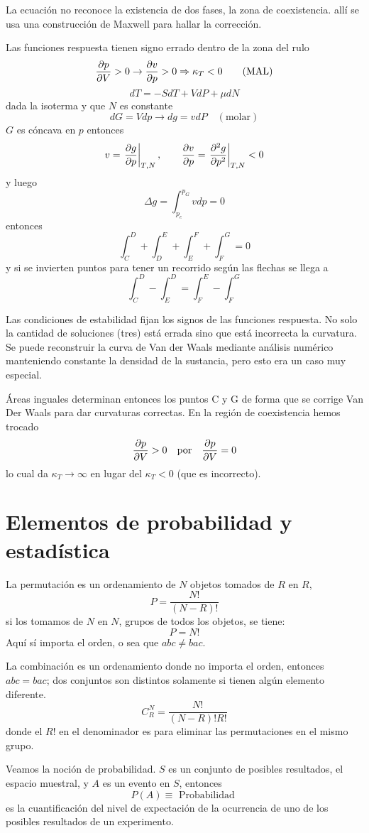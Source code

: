 \documentclass[10pt,oneside]{CBFT_book}
\begin{document}
La ecuación no reconoce la existencia de dos fases, la zona de coexistencia.
allí se usa una construcción de Maxwell para hallar la corrección.


Las funciones respuesta tienen signo errado dentro de la zona del rulo
\[
	\dpar{p}{V}>0 \rightarrow  \dpar{v}{p} >0 \Rightarrow \kappa_T < 0 \qquad (\mathrm{MAL})
\]
\[
	dT = -SdT + VdP + \mu dN
\]
dada la isoterma y que $N$ es constante 
\[
	dG = Vdp \rightarrow dg = v dP \quad (\mathrm{molar})
\]
$G$ es cóncava en $p$ entonces 
\[
	v = \left.\dpar{g}{p} \right|_{T,N}, \qquad  
	\dpar{v}{p} =\left.\dpar[2]{g}{p} \right|_{T,N} < 0
\]
y luego 
\[
	\Delta g = \int_{p_c}^{p_G} v dp = 0
\]
entonces 
\[
	\int_C^D + \int_D^E + \int_E^F + \int_F^G = 0
\]
y si se invierten puntos para tener un recorrido según las flechas se llega a 
\[
	\int_C^D - \int_E^D = \int_F^E - \int_F^G 
\]

Las condiciones de estabilidad fijan los signos de las funciones respuesta.
No solo la cantidad de soluciones (tres) está errada sino que está incorrecta
la curvatura.
Se puede reconstruir la curva de Van der Waals mediante análisis numérico manteniendo
constante la densidad de la sustancia, pero esto era un caso muy especial.


Áreas inguales determinan entonces los puntos C y G de forma que se corrige Van Der Waals para dar curvaturas
correctas. En la región de coexistencia hemos trocado
\[
	\dpar{p}{V} > 0 \quad \mathrm{por} \quad \dpar{p}{V}=0
\]
lo cual da $\kappa_T \to \infty$ en lugar del $\kappa_T < 0$ (que es incorrecto).


\section{Elementos de probabilidad y estadística}

La permutación es un ordenamiento de $N$ objetos tomados de $R$ en $R$,
\[
	P = \frac{N!}{(N-R)!}
\]
si los tomamos de $N$ en $N$, grupos de todos los objetos, se tiene:
\[
	P = N!
\]
Aquí sí importa el orden, o sea que $abc \neq bac$.

La combinación es un ordenamiento donde no importa el orden, entonces $abc = bac$;
dos conjuntos son distintos solamente si tienen algún elemento diferente.
\[
	C_R^N = \frac{N!}{(N-R)!R!}
\]
donde el $R!$ en el denominador es para eliminar las permutaciones en el mismo
grupo.

Veamos la noción de probabilidad. $S$ es un conjunto de posibles resultados, el
espacio muestral, y $A$ es un evento en $S$, entonces
\[
	P(A) \equiv \text{ Probabilidad }
\]
es la cuantificación del nivel de expectación de la ocurrencia de uno de los posibles
resultados de un experimento.
\end{document}
